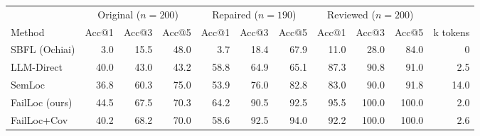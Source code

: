 \begin{tabular}{lrrrrrrrrrr}
\toprule
 & \multicolumn{3}{c}{Original ($n=200$)} & \multicolumn{3}{c}{Repaired ($n=190$)} & \multicolumn{3}{c}{Reviewed ($n=200$)} & \\
\cmidrule(lr){2-4}\cmidrule(lr){5-7}\cmidrule(lr){8-10}
Method & Acc@1 & Acc@3 & Acc@5 & Acc@1 & Acc@3 & Acc@5 & Acc@1 & Acc@3 & Acc@5 & k tokens \\
\midrule
SBFL (Ochiai) & 3.0 & 15.5 & 48.0 & 3.7 & 18.4 & 67.9 & 11.0 & 28.0 & 84.0 & 0 \\
LLM-Direct & 40.0 & 43.0 & 43.2 & 58.8 & 64.9 & 65.1 & 87.3 & 90.8 & 91.0 & 2.5 \\
SemLoc & 36.8 & 60.3 & 75.0 & 53.9 & 76.0 & 82.8 & 83.0 & 90.0 & 91.8 & 14.0 \\
FailLoc (ours) & 44.5 & 67.5 & 70.3 & 64.2 & 90.5 & 92.5 & 95.5 & 100.0 & 100.0 & 2.0 \\
FailLoc+Cov & 40.2 & 68.2 & 70.0 & 58.6 & 92.5 & 94.0 & 92.2 & 100.0 & 100.0 & 2.6 \\
\bottomrule
\end{tabular}
